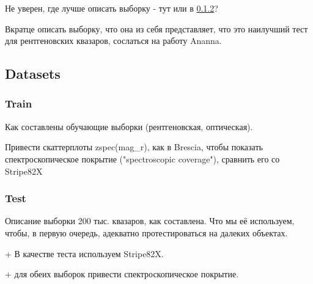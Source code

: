 Не уверен, где лучше описать выборку - тут или в \ref{sebsebsec:test}?

Вкратце описать выборку, что она из себя представляет, что это наилучший тест для рентгеновских квазаров, сослаться на работу Ananna.

\subsection{Datasets}

\subsubsection{Train}

Как составлены обучающие выборки (рентгеновская, оптическая).

Привести скаттерплоты zspec(mag\_r), как в Brescia, чтобы показать спектроскопическое покрытие ("spectroscopic coverage"), сравнить его со Stripe82X

\subsubsection{Test}\label{sebsebsec:test}

Описание выборки 200 тыс. квазаров, как составлена. Что мы её используем, чтобы, в первую очередь, адекватно протестироваться на далеких объектах.

+ В качестве теста используем Stripe82X.

+ для обеих выборок привести спектроскопическое покрытие.
